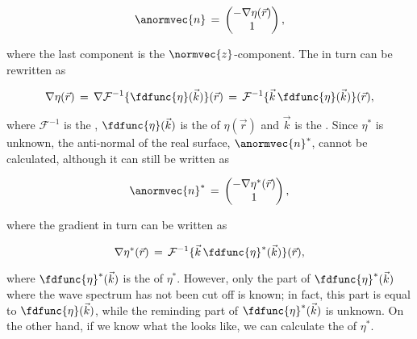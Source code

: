 \begin{equation} \label{eq:anti_normal_from_gradient}
\anormvec{n} \,=\, \left(\!\!\!\begin{array}{c}-\nabla\eta(\vec{r}) \\ 1\end{array}\!\!\!\right),
\end{equation}

where the last component is the $\normvec{z}$-component. The \gradient in turn can be rewritten as

\begin{equation}
\nabla\eta(\vec{r}) \,=\, \nabla\mathcal{F}^{-1}\{\fdfunc{\eta}(\vec{k})\}(\vec{r}) \,=\, \mathcal{F}^{-1}\{\vec{k}\,\fdfunc{\eta}(\vec{k})\}(\vec{r}),
\end{equation}

where $\mathcal{F}^{-1}$ is the , $\fdfunc{\eta}(\vec{k})$ is the  of $\eta(\vec{r})$ and $\vec{k}$ is the . Since $\eta^*$ is unknown, the anti-normal of the real surface, $\anormvec{n}^*$, cannot be calculated, although it can still be written as

\begin{equation} \label{eq:eta_anti_normal}
\anormvec{n}^* \,=\, \left(\!\!\!\begin{array}{c}-\nabla\eta^*(\vec{r}) \\ 1\end{array}\!\!\!\right),
\end{equation}

where the gradient in turn can be written as

\begin{equation}
\nabla\eta^*(\vec{r}) \,=\, \mathcal{F}^{-1}\{\vec{k}\,\fdfunc{\eta}^*(\vec{k})\}(\vec{r}),
\end{equation}

where $\fdfunc{\eta}^*(\vec{k})$ is the  of $\eta^*$. However, only the part of $\fdfunc{\eta}^*(\vec{k})$ where the wave spectrum has not been cut off is known; in fact, this part is equal to $\fdfunc{\eta}(\vec{k})$, while the reminding part of $\fdfunc{\eta}^*(\vec{k})$ is unknown. On the other hand, if we know what the  looks like, we can calculate the  of $\eta^*$.

